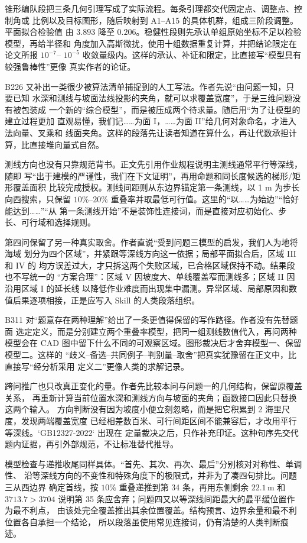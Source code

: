 锥形编队段把三条几何引理写成了实际流程。每条引理都交代固定点、调整点、控制角或
比例以及目标图形，随后映射到 A1--A15 的具体机群，组成三阶段调整。平面拟合检验值
由 $3.893$ 降至 $0.206$。稳健性段则先承认单组原始坐标不足以检验模型，再给半径和
角度加入高斯微扰，使用十组数据重复计算，并把结论限定在论文所报 $10^{-7}$--
$10^{-5}$ 收敛量级内。这样的承认、补证和限定，比直接写“模型具有较强鲁棒性”更像
真实作者的论证。

B226 又补出一类很少被算法清单捕捉到的人工写法。作者先说“由问题一知，只要已知
水深和测线与坡面法线投影的夹角，就可以求覆盖宽度”，于是三维问题没有被包装成
一个新的“综合模型”，而是被压成两个待求量。随后用“为了让模型的建立过程更加
直观易懂，我们记……为面 I，……为面 II”给几何对象命名，才进入法向量、叉乘和
线面夹角。这样的段落先让读者知道在算什么，再让代数承担计算，比直接堆向量式自然。

测线方向也没有只靠规范背书。正文先引用作业规程说明主测线通常平行等深线，随即
写“出于建模的严谨性，我们在下文证明”，再用命题和同长度候选的梯形/矩形覆盖面积
比较完成授权。测线间距则从东边界锚定第一条测线，以 1 m 为步长向西搜索，只保留
$10\%$--$20\%$ 重叠率并取最低可行值。这里的“以……为始边”“恰好能达到……”“从
第一条测线开始”不是装饰性连接词，而是直接对应初始化、步长、可行域和选择规则。

第四问保留了另一种真实取舍。作者直说“受到问题三模型的启发，我们人为地将海域
划分为四个区域”，并紧跟等深线方向这一依据；局部平面拟合后，区域 III 和 IV 的
均方误差过大，才只拆这两个失败区域，已合格区域保持不动。结果段也不写统一的
“方案合理”：区域 V 因坡度大、单线覆盖窄而测线多；区域 II 因沿用区域 I 的延长线
以降低作业难度而出现集中漏测。异常区域、局部原因和数值后果逐项相接，正是应写入
Skill 的人类段落组织。

B311 对“题意存在两种理解”给出了一条更值得保留的写作路径。作者没有先替题面
选定定义，而是分别建立两个重叠率模型，把同一组测线数值代入，再问两种模型会在
CAD 图中留下什么不同的可观察区域。图形裁决后才舍弃模型一、保留模型二。这样的
“歧义--备选--共同例子--判别量--取舍”把真实犹豫留在正文中，比直接写“经分析采用
定义二”更像人类的求解记录。

跨问推广也只改真正变化的量。作者先比较本问与问题一的几何结构，保留原覆盖关系，
再重新计算当前位置水深和测线方向与坡面的夹角；函数接口因此只替换这两个输入。
方向判断没有因为坡度小便立刻忽略，而是把它积累到 2 海里尺度，发现两端覆盖宽度
已经相差数百米、可行间距区间不能兼容后，才改用平行等深线。`GB12327-2022` 出现在
定量裁决之后，只作补充印证。这种句序先交代题内证据，再引外部规范，不让标准替代推导。

模型检查与递推收尾同样具体。“首先、其次、再次、最后”分别核对对称性、单调性、
沿等深线方向的不变性和特殊角度下的极限式，并非为了凑四句排比。问题三从西边界
确定首线，按 $10\%$ 重叠递推到第 34 条，再用东侧剩余 $22.1\,\mathrm{m}$ 和
$3713.7>3704$ 说明第 35 条应舍弃；问题四又以等深线间距最大的最平缓位置作为最不利点，
由该处完全覆盖推出其余位置覆盖。结构预言、边界余量和最不利位置各自承担一个结论，
所以段落虽使用常见连接词，仍有清楚的人类判断痕迹。

